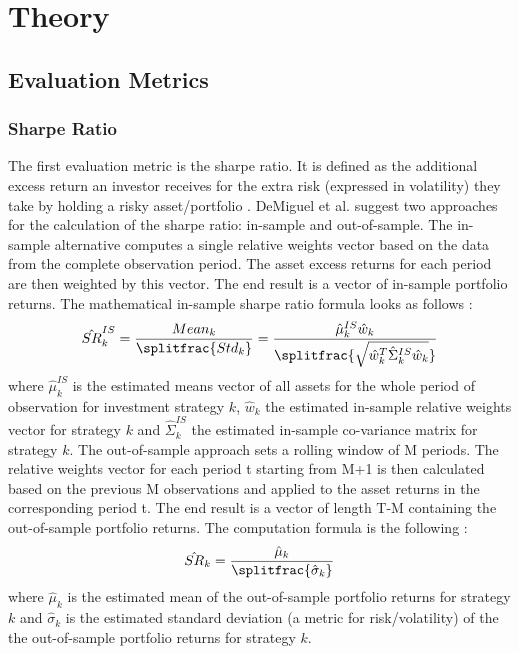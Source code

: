 \documentclass{article}
\begin{document}
\section{Theory}
\subsection{Evaluation Metrics}
\subsubsection{Sharpe Ratio}
The first evaluation metric is the sharpe ratio. It is defined as the additional excess return an investor receives for the extra risk (expressed in volatility) they take by holding a risky asset/portfolio \cite{SHP}. DeMiguel et al. \cite{DEM09} suggest two approaches for the calculation of the sharpe ratio: in-sample and out-of-sample.\endgraf
The in-sample alternative computes a single relative weights vector based on the data from the complete observation period. The asset excess returns for each period are then weighted by this vector. The end result is a vector of in-sample portfolio returns. The mathematical in-sample sharpe ratio formula looks as follows \cite{DEM09}:
\begin{align}
\hat{SR}_{k}^{IS} = \frac{Mean_{k}}{\splitfrac{Std_{k}}} = \frac{\hat{\mu}_{k}^{IS}\hat{w}_{k}}{\splitfrac{\sqrt{\hat{w}_{k}^{T}\hat{\Sigma}_{k}^{IS}\hat{w}_{k}}}}
\end{align}
where $\hat{\mu}_{k}^{IS}$ is the estimated means vector of all assets for the whole period of observation for investment strategy $k$, $\hat{w}_{k}$ the estimated in-sample relative weights vector for strategy $k$ and $\hat{\Sigma}_{k}^{IS}$ the estimated in-sample co-variance matrix for strategy $k$.\endgraf
The out-of-sample approach sets a rolling window of M periods. The relative weights vector for each period t starting from M+1 is then calculated based on the previous M observations and applied to the asset returns in the corresponding period t. The end result is a vector of length T-M containing the out-of-sample portfolio returns. The computation formula is the following \cite{DEM09}:
\begin{align}
\hat{SR}_{k} = \frac{\hat{\mu}_{k}}{\splitfrac{\hat{\sigma}_{k}}} 
\end{align} 
where $\hat{\mu}_{k}$ is the estimated mean of the out-of-sample portfolio returns for strategy $k$ and $\hat{\sigma}_{k}$ is the estimated standard deviation (a metric for risk/volatility) of the the out-of-sample portfolio returns for strategy $k$.
\end{document}
